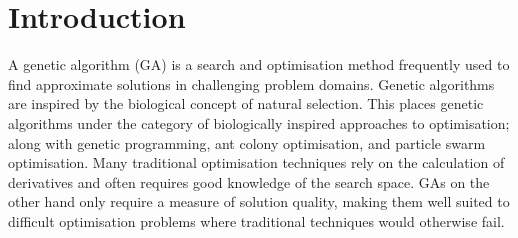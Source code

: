 \documentclass[journal]{IEEEtran}
\begin{document}




\maketitle









%
\IEEEpeerreviewmaketitle



\section{Introduction}

\noindent 
A genetic algorithm (GA) is a search and optimisation method frequently used to find approximate solutions in challenging problem domains. Genetic algorithms are inspired by the biological concept of natural selection. This places genetic algorithms under the category of biologically inspired approaches to optimisation; along with genetic programming, ant colony optimisation, and particle swarm optimisation. Many traditional optimisation techniques rely on the calculation of derivatives and often requires good knowledge of the search space. GAs on the other hand only require a measure of solution quality, making them well suited to difficult optimisation problems where traditional techniques would otherwise fail.
\end{document}
